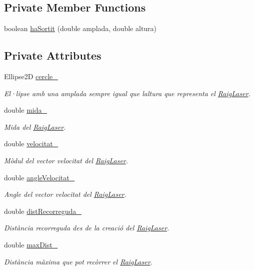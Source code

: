 \subsection*{Private Member Functions}
\begin{DoxyCompactItemize}
\item 
boolean \hyperlink{class_raig_laser_a5789bd849e81d44087c74c909cdf03a0}{ha\+Sortit} (double amplada, double altura)
\end{DoxyCompactItemize}
\subsection*{Private Attributes}
\begin{DoxyCompactItemize}
\item 
Ellipse2\+D \hyperlink{class_raig_laser_a48b0b5a92a7424862bf6ebe59c498577}{cercle\+\_\+}
\begin{DoxyCompactList}\small\item\em El·lipse amb una amplada sempre igual que l\textquotesingle{}altura que representa el \hyperlink{class_raig_laser}{Raig\+Laser}. \end{DoxyCompactList}\item 
double \hyperlink{class_raig_laser_ac18a272d02d6d090eebee561f05c1a0a}{mida\+\_\+}
\begin{DoxyCompactList}\small\item\em Mida del \hyperlink{class_raig_laser}{Raig\+Laser}. \end{DoxyCompactList}\item 
double \hyperlink{class_raig_laser_af4bf8a2a716caaa467e7a01ca1566924}{velocitat\+\_\+}
\begin{DoxyCompactList}\small\item\em Mòdul del vector velocitat del \hyperlink{class_raig_laser}{Raig\+Laser}. \end{DoxyCompactList}\item 
double \hyperlink{class_raig_laser_a2a0e32ff8599a77e2d1f315924c0da14}{angle\+Velocitat\+\_\+}
\begin{DoxyCompactList}\small\item\em Angle del vector velocitat del \hyperlink{class_raig_laser}{Raig\+Laser}. \end{DoxyCompactList}\item 
double \hyperlink{class_raig_laser_aecdc87070f24e6116db8f89d61d75b3a}{dist\+Recorreguda\+\_\+}
\begin{DoxyCompactList}\small\item\em Distància recorreguda des de la creació del \hyperlink{class_raig_laser}{Raig\+Laser}. \end{DoxyCompactList}\item 
double \hyperlink{class_raig_laser_a950579f9b8aec21d629287044a7a65e7}{max\+Dist\+\_\+}
\begin{DoxyCompactList}\small\item\em Distància màxima que pot recòrrer el \hyperlink{class_raig_laser}{Raig\+Laser}. \end{DoxyCompactList}\end{DoxyCompactItemize}


